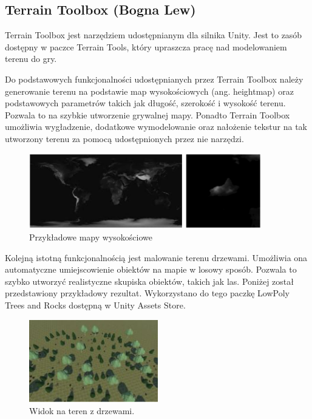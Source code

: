 \subsection{Terrain Toolbox (Bogna Lew)}
Terrain Toolbox jest narzędziem udostępnianym dla silnika Unity. Jest to zasób dostępny w paczce Terrain Tools, który
upraszcza pracę nad modelowaniem terenu do gry.

Do podstawowych funkcjonalności udostępnianych przez Terrain Toolbox należy generowanie terenu na podstawie
map wysokościowych (ang. heightmap) oraz podstawowych parametrów takich jak długość, szerokość i wysokość terenu.
Pozwala to na szybkie utworzenie grywalnej mapy. Ponadto Terrain Toolbox umożliwia wygładzenie, dodatkowe
wymodelowanie oraz nałożenie tekstur na tak utworzony terenu za pomocą udostępnionych przez nie narzędzi.

\begin{figure}[h!]
    \centering
    \includegraphics[width=0.9\textwidth]{images/modelowanie_terenu/przykladowe_heightmapy.jpg}
    \caption{Przykładowe mapy wysokościowe}
\end{figure}

Kolejną istotną funkcjonalnością jest malowanie terenu drzewami. Umożliwia ona automatyczne umiejscowienie obiektów na
mapie w losowy sposób. Pozwala to szybko utworzyć realistyczne skupiska obiektów, takich jak las. Poniżej
został przedstawiony przykładowy rezultat. Wykorzystano do tego paczkę LowPoly Trees and Rocks dostępną w Unity
Assets Store.

\begin{figure}[h!]
    \centering
    \includegraphics[width=0.5\textwidth]{images/modelowanie_terenu/drzewa.jpg}
    \caption{Widok na teren z drzewami.}
\end{figure}
